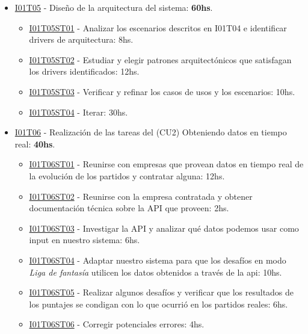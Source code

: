 \begin{itemize}
\item \underline{I01T05} - Diseño de la arquitectura del sistema: \textbf{60hs}.
  \begin{itemize}
    \item \underline{I01T05ST01} - Analizar los escenarios descritos en I01T04 e identificar drivers de arquitectura: 8hs. 
    \item \underline{I01T05ST02} - Estudiar y elegir patrones arquitectónicos que satisfagan los drivers identificados: 12hs.
    \item \underline{I01T05ST03} - Verificar y refinar los casos de usos y los escenarios: 10hs.
    \item \underline{I01T05ST04} - Iterar: 30hs.
   \end{itemize}
\hfill

\item \underline{I01T06} - Realización de las tareas del (CU2)  Obteniendo datos en tiempo real: \textbf{40hs}.
  \begin{itemize}
    \item \underline{I01T06ST01} - Reunirse con empresas que provean datos en tiempo real de la evolución de los partidos y contratar alguna: 12hs.
    \item \underline{I01T06ST02} - Reunirse con la empresa contratada y obtener documentación técnica sobre la API que proveen: 2hs.
    \item \underline{I01T06ST03} - Investigar la API y analizar qué datos podemos usar como input en nuestro sistema: 6hs.
    \item \underline{I01T06ST04} - Adaptar nuestro sistema para que los desafíos en modo \emph{Liga de fantasía} utilicen los datos obtenidos a través de la api: 10hs.
    \item \underline{I01T06ST05} - Realizar algunos desafíos y verificar que los resultados de los puntajes se condigan con lo que ocurrió en los partidos reales: 6hs.
    \item \underline{I01T06ST06} - Corregir potenciales errores: 4hs.
  \end{itemize}
\hfill


\end{itemize}

